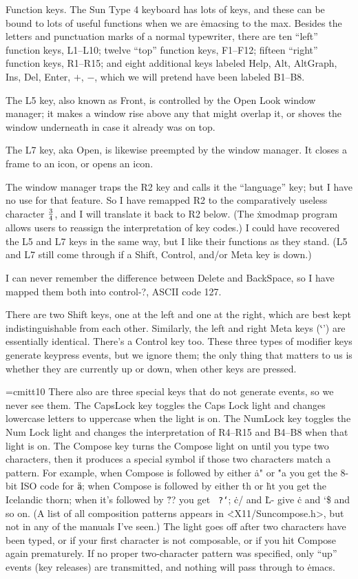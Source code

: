 Function keys.
The Sun Type 4 keyboard has lots of keys, and these can be bound to lots
of useful functions when we are \.{emacs}ing to the max. Besides the
letters and punctuation marks of a normal typewriter, there are ten
``left'' function keys, L1--L10; twelve ``top'' function keys, F1--F12;
fifteen ``right'' function keys, R1--R15; and eight additional keys
labeled Help, Alt, AltGraph, Ins, Del, Enter, $+$, $-$, which we will
pretend have been labeled B1--B8.

The L5 key, also known as Front, is controlled by the Open Look
window manager; it makes a window rise above any that might overlap it,
or shoves the window underneath in case it already was on top.

The L7 key, aka Open, is likewise preempted by the
window manager. It closes a frame to an icon, or opens an icon.

The window manager traps the R2 key and calls it the ``language'' key;
but I have no use for that feature. So I have remapped R2 to the comparatively
useless character $3\over4$, and I will translate it back to R2 below. (The
\.{xmodmap} program allows users to reassign the interpretation of key codes.)
I could have recovered the L5 and L7 keys in the same way, but I like
their functions as they stand. (L5 and L7 still come through if a
Shift, Control, and/or Meta key is down.)

I can never remember the difference between Delete and BackSpace, so I
have mapped them both into control-?, ASCII code 127.

There are two Shift keys, one at the left and one at the right, which
are best kept indistinguishable from each other. Similarly, the left
and right Meta keys (`\.{}') are essentially identical. There's a
Control key too. These three types of modifier keys generate keypress
events, but we ignore them; the only thing that matters to us is whether
they are currently up or down, when other keys are pressed.

\font\ttit=cmitt10
There also are three special keys that do not generate events, so we
never see them. The CapsLock key toggles the Caps Lock light and
changes lowercase letters to uppercase when the light is on. The
NumLock key toggles the Num Lock light and changes the interpretation
of R4--R15 and B4--B8 when that light is on. The Compose key turns the
Compose light on until you type two characters, then it produces a
special symbol if those two characters match a pattern. For example,
when Compose is followed by either \.{a"} or \.{"a} you get the 8-bit
ISO code for {\tt \"a}; when Compose is followed by either \.{th} or
\.{ht} you get the Icelandic thorn; when it's followed by \.{??} you get {\tt
?`}; \.{c/} and \.{L-} give \rlap{\./}\.c and {\ttit\char`\$}
and so on. (A list of all composition patterns
appears in \.{<X11/Suncompose.h>}, but not in any of the manuals
I've seen.) The light goes off after two characters have been
typed, or if your first character is not composable, or if
you hit Compose again prematurely. If no proper two-character pattern
was specified, only ``up'' events (key releases) are transmitted, and
nothing will pass through to \.{emacs}.

